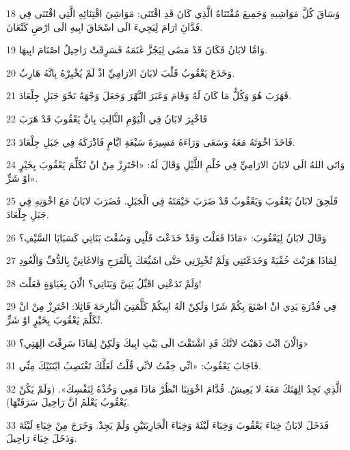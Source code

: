 \par 18 وَسَاقَ كُلَّ مَوَاشِيهِ وَجَمِيعَ مُقْتَنَاهُ الَّذِي كَانَ قَدِ اقْتَنَى: مَوَاشِيَ اقْتِنَائِهِ الَّتِي اقْتَنَى فِي فَدَّانَِ ارَامَ لِيَجِيءَ الَى اسْحَاقَ ابِيهِ الَى ارْضِ كَنْعَانَ.
\par 19 وَامَّا لابَانُ فَكَانَ قَدْ مَضَى لِيَجُزَّ غَنَمَهُ فَسَرِقَتْ رَاحِيلُ اصْنَامَ ابِيهَا.
\par 20 وَخَدَعَ يَعْقُوبُ قَلْبَ لابَانَ الارَامِيِّ اذْ لَمْ يُخْبِرْهُ بِانَّهُ هَارِبٌ.
\par 21 فَهَرَبَ هُوَ وَكُلُّ مَا كَانَ لَهُ وَقَامَ وَعَبَرَ النَّهْرَ وَجَعَلَ وَجْهَهُ نَحْوَ جَبَلِ جِلْعَادَ.
\par 22 فَاخْبِرَ لابَانُ فِي الْيَوْمِ الثَّالِثِ بِانَّ يَعْقُوبَ قَدْ هَرَبَ
\par 23 فَاخَذَ اخْوَتَهُ مَعَهُ وَسَعَى وَرَاءَهُ مَسِيرَةَ سَبْعَةِ ايَّامٍ فَادْرَكَهُ فِي جَبَلِ جِلْعَادَ.
\par 24 وَاتَى اللهُ الَى لابَانَ الارَامِيِّ فِي حُلْمِ اللَّيْلِ وَقَالَ لَهُ: «احْتَرِزْ مِنْ انْ تُكَلِّمَ يَعْقُوبَ بِخَيْرٍ اوْ شَرٍّ».
\par 25 فَلَحِقَ لابَانُ يَعْقُوبَ وَيَعْقُوبُ قَدْ ضَرَبَ خَيْمَتَهُ فِي الْجَبَلِ. فَضَرَبَ لابَانُ مَعَ اخْوَتِهِ فِي جَبَلِ جِلْعَادَ.
\par 26 وَقَالَ لابَانُ لِيَعْقُوبَ: «مَاذَا فَعَلْتَ وَقَدْ خَدَعْتَ قَلْبِي وَسُقْتَ بَنَاتِي كَسَبَايَا السَّيْفِ؟
\par 27 لِمَاذَا هَرَبْتَ خُفْيَةً وَخَدَعْتَنِي وَلَمْ تُخْبِرْنِي حَتَّى اشَيِّعَكَ بِالْفَرَحِ وَالاغَانِيِّ بِالدُّفِّ وَالْعُودِ
\par 28 وَلَمْ تَدَعْنِي اقَبِّلُ بَنِيَّ وَبَنَاتِي؟ الْانَ بِغَبَاوَةٍ فَعَلْتَ!
\par 29 فِي قُدْرَةِ يَدِي انْ اصْنَعَ بِكُمْ شَرّا وَلَكِنْ الَهُ ابِيكُمْ كَلَّمَنِيَ الْبَارِحَةَ قَائِلا: احْتَرِزْ مِنْ انْ تُكَلِّمَ يَعْقُوبَ بِخَيْرٍ اوْ شَرٍّ.
\par 30 وَالْانَ انْتَ ذَهَبْتَ لانَّكَ قَدِ اشْتَقْتَ الَى بَيْتِ ابِيكَ وَلَكِنْ لِمَاذَا سَرِقْتَ الِهَتِي؟»
\par 31 فَاجَابَ يَعْقُوبُ: «انِّي خِفْتُ لانِّي قُلْتُ لَعَلَّكَ تَغْتَصِبُ ابْنَتَيْكَ مِنِّي.
\par 32 الَّذِي تَجِدُ الِهَتَكَ مَعَهُ لا يَعِيشُ. قُدَّامَ اخْوَتِنَا انْظُرْ مَاذَا مَعِي وَخُذْهُ لِنَفْسِكَ». (وَلَمْ يَكُنْ يَعْقُوبُ يَعْلَمُ انَّ رَاحِيلَ سَرَقَتْهَا).
\par 33 فَدَخَلَ لابَانُ خِبَاءَ يَعْقُوبَ وَخِبَاءَ لَيْئَةَ وَخِبَاءَ الْجَارِيَتَيْنِ وَلَمْ يَجِدْ. وَخَرَجَ مِنْ خِبَاءِ لَيْئَةَ وَدَخَلَ خِبَاءَ رَاحِيلَ.
